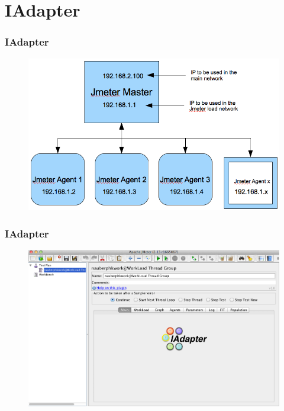 \documentclass{beamer}
\begin{document}
\section{IAdapter}

\begin{frame}
\frametitle{IAdapter}
\begin{figure}[H]
\centering
\includegraphics[width=1\linewidth]{jmeter-distributed-structure.png}
\end{figure}
\end{frame}




\begin{frame}
\frametitle{IAdapter}
\begin{figure}[H]
\centering
\includegraphics[width=1\linewidth]{iadapter1.png}
\end{figure}
\end{frame}
\end{document}
